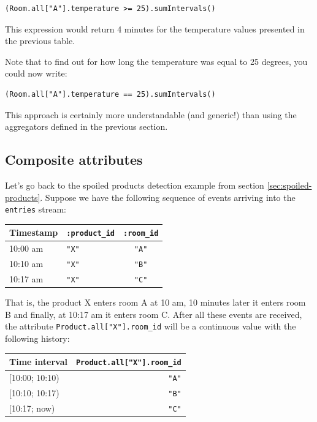 \documentclass{report}
\begin{document}
\begin{verbatim}
(Room.all["A"].temperature >= 25).sumIntervals()
\end{verbatim}

This expression would return 4 minutes for the temperature values
presented in the previous table.

Note that to find out for how long the temperature was equal to 25
degrees, you could now write:

\begin{verbatim}
(Room.all["A"].temperature == 25).sumIntervals()
\end{verbatim}

This approach is certainly more understandable (and generic!) than
using the aggregators defined in the previous section.

\subsection{Composite attributes}

Let's go back to the spoiled products detection example from section
\ref{sec:spoiled-products}. Suppose we have the following
sequence of events arriving into the \verb=entries= stream:

\begin{tabular}{ |l|l|c| }
  \hline
  Timestamp & \verb=:product_id= & \verb=:room_id= \\
  \hline
  10:00 am & \verb="X"= & \verb="A"= \\
  10:10 am & \verb="X"= & \verb="B"= \\
  10:17 am & \verb="X"= & \verb="C"= \\
  \hline
\end{tabular}

That is, the product X enters room A at 10 am, 10 minutes later it
enters room B and finally, at 10:17 am it enters room C. After all
these events are received, the attribute
\verb=Product.all["X"].room_id= will be a continuous value with the
following history:

\begin{tabular}{ |l|r| }
  \hline
  Time interval & \verb=Product.all["X"].room_id= \\
  \hline
  $[$10:00; 10:10) & \verb="A"= \\
  $[$10:10; 10:17) & \verb="B"= \\
  $[$10:17;   now) & \verb="C"= \\
  \hline
\end{tabular}
\end{document}
